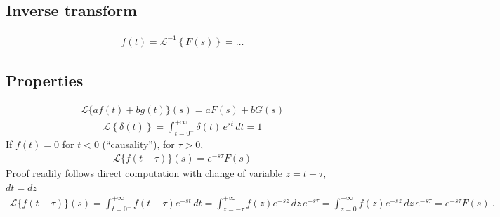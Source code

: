 \documentclass[letterpaper,10pt,english]{jupyterBook}
\begin{document}
\subsection{Inverse transform}
\label{\detokenize{ch/complex/laplace-def-thm:inverse-transform}}\begin{equation*}
\begin{split}f(t) = \mathscr{L}^{-1}\left\{ F(s) \right\} = \dots\end{split}
\end{equation*}

\subsection{Properties}
\label{\detokenize{ch/complex/laplace-def-thm:properties}}
\sphinxAtStartPar
{}
\begin{equation*}
\begin{split}\mathscr{L}\{ a f(t) + b g(t) \}(s) = a F(s) + b G(s)\end{split}
\end{equation*}
\sphinxAtStartPar
{}
\begin{equation*}
\begin{split}\mathscr{L}\left\{ \delta(t) \right\} = \int_{t=0^-}^{+\infty} \delta(t) \, e^{st} \, dt = 1 \end{split}
\end{equation*}
\sphinxAtStartPar
{} If \(f(t) = 0\) for \(t < 0\) (“causality”), for \(\tau > 0\),
\begin{equation*}
\begin{split}\mathscr{L}\{ f(t-\tau) \}(s) = e^{-s \tau} F(s)\end{split}
\end{equation*}
\sphinxAtStartPar
Proof readily follows direct computation with change of variable \(z = t - \tau\), \(dt = dz\)
\begin{equation*}
\begin{split}\mathscr{L}\{ f(t - \tau) \}(s) = \int_{t=0^-}^{+\infty} f(t-\tau) e^{-s t} \, dt = \int_{z = - \tau}^{+\infty} f(z) e^{-s z } \, dz \, e^{-s \tau} = \int_{z = 0}^{+\infty} f(z) e^{-s z } \, dz \, e^{-s \tau} = e^{-s \tau} F(s) \ . \end{split}
\end{equation*}
\sphinxAtStartPar
{}
\end{document}
